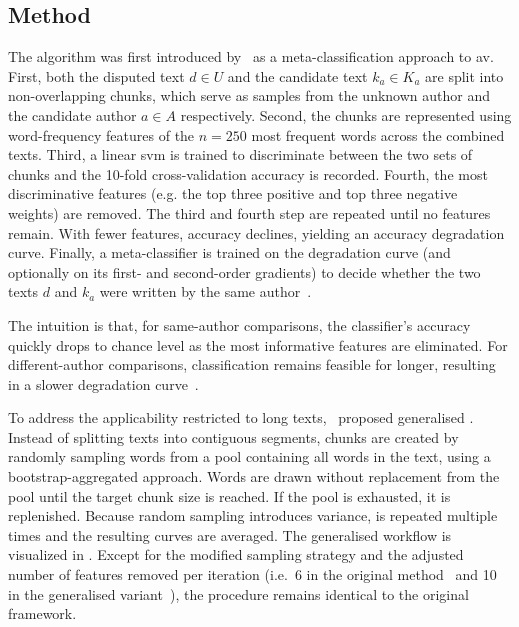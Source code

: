 \subsection{\unmasking{} Method}
\label{subsec:unmasking}

The \unmasking{} algorithm was first introduced by \citet{koppel_authorship_2004}\ as a meta-classification approach to \ac{av}. 
First, both the disputed text $d \in U$ and the candidate text $k_a \in K_a$ are split into non-overlapping chunks, which serve as samples from the unknown author and the candidate author $a \in A$ respectively. 
Second, the chunks are represented using word-frequency features of the $n=250$ most frequent words across the combined texts.
Third, a linear \ac{svm} is trained to discriminate between the two sets of chunks and the 10-fold cross-validation accuracy is recorded.
Fourth, the most discriminative features (e.g. the top three positive and top three negative weights) are removed.  
The third and fourth step are repeated until no features remain.
With fewer features, accuracy declines, yielding an accuracy degradation curve.  
Finally, a meta-classifier is trained on the degradation curve (and optionally on its first- and second-order gradients) to decide whether the two texts $d$ and $k_a$ were written by the same author~\citep{bevendorff_generalizing_2019}.  

The intuition is that, for same-author comparisons, the classifier’s accuracy quickly drops to chance level as the most informative features are eliminated. 
For different-author comparisons, classification remains feasible for longer, resulting in a slower degradation curve~\citep{stein_intrinsic_2011,tyo_state_2022,bevendorff_divergence_based_2020,stamatatos_survey_2009}. 

To address the applicability restricted to long texts, \citet{bevendorff_generalizing_2019,bevendorff_divergence_based_2020}\ proposed generalised \unmasking{}. 
Instead of splitting texts into contiguous segments, chunks are created by randomly sampling words from a pool containing all words in the text, using a bootstrap-aggregated approach.
Words are drawn without replacement from the pool until the target chunk size is reached.
If the pool is exhausted, it is replenished. 
Because random sampling introduces variance, \unmasking{} is repeated multiple times and the resulting curves are averaged. 
The generalised \unmasking{} workflow is visualized in . 
Except for the modified sampling strategy and the adjusted number of features removed per iteration (i.e.\ 6 in the original method~\citep{koppel_authorship_2004} and 10 in the generalised variant~\citep{bevendorff_generalizing_2019}), the procedure remains identical to the original \unmasking{} framework.

